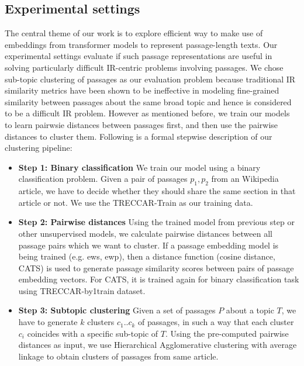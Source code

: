 \subsection{Experimental settings} The central theme of our work is to explore efficient way to make use of embeddings from transformer models to represent passage-length texts. Our experimental settings evaluate if such passage representations are useful in solving particularly difficult IR-centric problems involving passages. We chose sub-topic clustering of passages as our evaluation problem because traditional IR similarity metrics have been shown to be ineffective in modeling fine-grained similarity between passages about the same broad topic and hence is considered to be a difficult IR problem. However as mentioned before, we train our models to learn pairwsie distances between passages first, and then use the pairwise distances to cluster them. Following is a formal stepwise description of our clustering pipeline:
\begin{itemize}
    \item \textbf{Step 1: Binary classification} We train our model using a binary classification problem. Given a pair of passages $p_1, p_2$ from an Wikipedia article, we have to decide whether they should share the same section in that article or not. We use the TRECCAR-Train as our training data.
    \item \textbf{Step 2: Pairwise distances} Using the trained model from previous step or other unsupervised models, we calculate pairwise distances between all passage pairs which we want to cluster. If a passage embedding model is being trained (e.g. ews, ewp), then a distance function (cosine distance, CATS) is used to generate passage similarity scores between pairs of passage embedding vectors. For CATS, it is trained again for binary classification task using TRECCAR-by1train dataset.
    \item \textbf{Step 3: Subtopic clustering} Given a set of passages $P$ about a topic $T$, we have to generate $k$ clusters $c_1 .. c_k$ of passages, in such a way that each cluster $c_i$ coincides with a specific sub-topic of $T$. Using the pre-computed pairwise distances as input, we use Hierarchical Agglomerative clustering with average linkage to obtain clusters of passages from same article.
\end{itemize}

